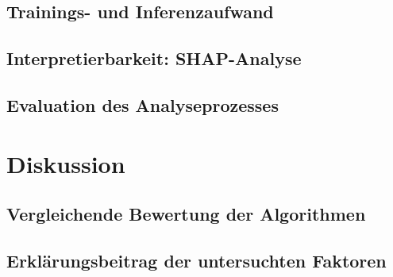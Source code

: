 \documentclass[12pt,a4paper]{article}
\begin{document}
\subsection{Trainings- und Inferenzaufwand}

\subsection{Interpretierbarkeit: SHAP-Analyse}



\subsection{Evaluation des Analyseprozesses}

\section{Diskussion}
\subsection{Vergleichende Bewertung der Algorithmen}

\subsection{Erklärungsbeitrag der untersuchten Faktoren}
\end{document}
